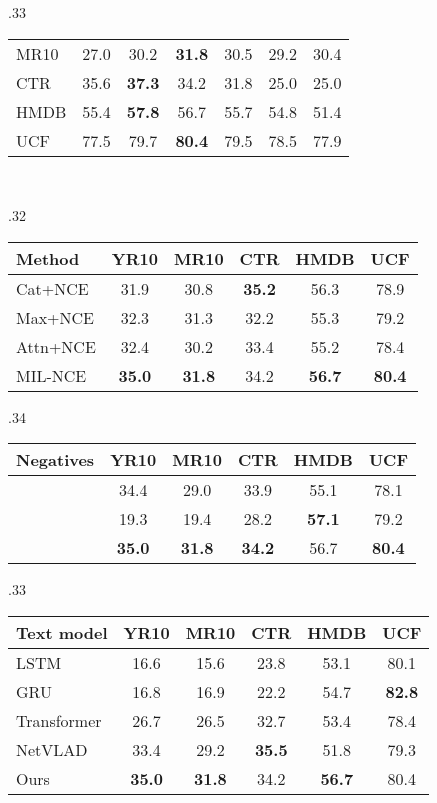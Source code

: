 \documentclass[10pt,twocolumn,letterpaper]{article}
\newcommand{\rYC}{YR10}
\newcommand{\rMSRVTT}{MR10}
\newcommand{\rCrossTask}{CTR}
\newcommand{\tablestyle}[2]{\setlength{\tabcolsep}{#1}\renewcommand{\arraystretch}{#2}\centering\footnotesize}
\begin{document}
\begin{table*}
\begin{subtable}[t]{.33\linewidth}
{\begin{tabular}[t]{l|cccccc}
				\rMSRVTT       & 27.0 & 30.2 & \textbf{31.8} & 30.5 & 29.2 & 30.4 \\
				\rCrossTask      & 35.6 & \textbf{37.3} & 34.2 & 31.8 & 25.0 & 25.0 \\
				HMDB       & 55.4 & \textbf{57.8} & 56.7 & 55.7 & 54.8 & 51.4 \\
				UCF       & 77.5 &  79.7 & \textbf{80.4} & 79.5 & 78.5 & 77.9\\
			\end{tabular}
		}	 \vspace{-1mm}		
	\end{subtable}
	\\
	\begin{subtable}[t]{.32\linewidth}\centering
		\tablestyle{2pt}{1.05}
{ 
			\caption{\textbf{MIL strategy}} \label{tab:ablation-mil}
			\begin{tabular}[t]{@{}l|ccccc@{}}
Method & \rYC & \rMSRVTT & \rCrossTask  & HMDB & UCF \\
				\hline
				Cat+NCE  & 31.9 & 30.8 & \textbf{35.2} & 56.3 & 78.9 \\
				Max+NCE  & 32.3 & 31.3 &  32.2 & 55.3 & 79.2 \\
				Attn+NCE & 32.4 & 30.2 & 33.4 & 55.2 & 78.4 \\
MIL-NCE & \textbf{35.0} & \textbf{31.8} & 34.2 & \textbf{56.7} & \textbf{80.4} \\
\end{tabular}}
	\end{subtable}\begin{subtable}[t]{.34\linewidth}
		\tablestyle{2pt}{1.05}
\caption{\textbf{Symmetric vs asymmetric negatives}}  \label{tab:ablation-symmetric}
		{   	\begin{tabular}[t]{@{}l|ccccc@{}}
Negatives & \rYC & \rMSRVTT & \rCrossTask & HMDB  & UCF  \\
				\hline
				 & 34.4 & 29.0 &  33.9 & 55.1 & 78.1  \\
				 & 19.3 & 19.4 & 28.2 &  \textbf{57.1} & 79.2\\
				 & \textbf{35.0} & \textbf{31.8} &  \textbf{34.2}  & 56.7 &  \textbf{80.4} \\
\end{tabular}}
	\end{subtable}
	\begin{subtable}[t]{.33\linewidth}
		\tablestyle{2pt}{1.05}
		{		\caption{\textbf{Language models}} \label{tab:ablation-language}
\begin{tabular}[t]{@{}l|ccccc@{}}
				Text model & \rYC & \rMSRVTT & \rCrossTask & HMDB & UCF  \\
				\hline
				LSTM & 16.6 & 15.6 & 23.8 & 53.1 & 80.1 \\
				GRU & 16.8 & 16.9 & 22.2& 54.7 & \textbf{82.8} \\
				Transformer & 26.7 & 26.5 & 32.7 & 53.4 & 78.4 \\
				NetVLAD & 33.4 & 29.2 & \textbf{35.5} & 51.8 & 79.3 \\
				Ours & \textbf{35.0} & \textbf{31.8}  & 34.2 &  \textbf{56.7} &  80.4 \\
			\end{tabular}

}
\end{subtable}
\end{table*}
\end{document}
